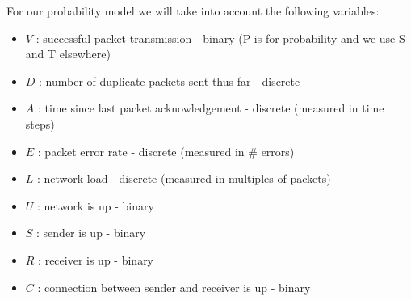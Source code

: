 \documentclass[11pt]{article}
\providecommand{\tightlist}{%
      \setlength{\itemsep}{0pt}\setlength{\parskip}{0pt}}
\begin{document}
    For our probability model we will take into account the following
variables:

\begin{itemize}
\tightlist
\item
  \(V\) : successful packet transmission - binary (P is for probability
  and we use S and T elsewhere)
\item
  \(D\) : number of duplicate packets sent thus far - discrete
\item
  \(A\) : time since last packet acknowledgement - discrete (measured in
  time steps)
\item
  \(E\) : packet error rate - discrete (measured in \# errors)
\item
  \(L\) : network load - discrete (measured in multiples of packets)
\item
  \(U\) : network is up - binary
\item
  \(S\) : sender is up - binary
\item
  \(R\) : receiver is up - binary
\item
  \(C\) : connection between sender and receiver is up - binary
\end{itemize}
\end{document}

